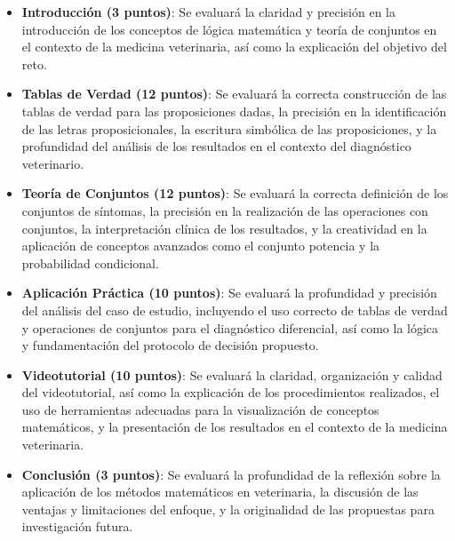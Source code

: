 \documentclass[a4,11pt]{aleph-notas}
\begin{document}
\begin{itemize}
    \item \textbf{Introducción (3 puntos)}: Se evaluará la claridad y precisión en la introducción de los conceptos de lógica matemática y teoría de conjuntos en el contexto de la medicina veterinaria, así como la explicación del objetivo del reto.
    
    \item \textbf{Tablas de Verdad (12 puntos)}: Se evaluará la correcta construcción de las tablas de verdad para las proposiciones dadas, la precisión en la identificación de las letras proposicionales, la escritura simbólica de las proposiciones, y la profundidad del análisis de los resultados en el contexto del diagnóstico veterinario.
    
    \item \textbf{Teoría de Conjuntos (12 puntos)}: Se evaluará la correcta definición de los conjuntos de síntomas, la precisión en la realización de las operaciones con conjuntos, la interpretación clínica de los resultados, y la creatividad en la aplicación de conceptos avanzados como el conjunto potencia y la probabilidad condicional.
    
    \item \textbf{Aplicación Práctica (10 puntos)}: Se evaluará la profundidad y precisión del análisis del caso de estudio, incluyendo el uso correcto de tablas de verdad y operaciones de conjuntos para el diagnóstico diferencial, así como la lógica y fundamentación del protocolo de decisión propuesto.
    
    \item \textbf{Videotutorial (10 puntos)}: Se evaluará la claridad, organización y calidad del videotutorial, así como la explicación de los procedimientos realizados, el uso de herramientas adecuadas para la visualización de conceptos matemáticos, y la presentación de los resultados en el contexto de la medicina veterinaria.
    
    \item \textbf{Conclusión (3 puntos)}: Se evaluará la profundidad de la reflexión sobre la aplicación de los métodos matemáticos en veterinaria, la discusión de las ventajas y limitaciones del enfoque, y la originalidad de las propuestas para investigación futura.
\end{itemize}
\end{document}
